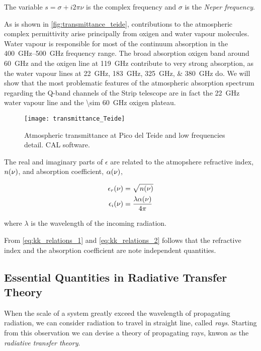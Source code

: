 The variable $s = \sigma + i 2\pi\nu$ is the complex frequency and $\sigma$
is the \emph{Neper frequency}.

As is shown in \autoref{fig:transmittance_teide}, contributions to the
atmospheric complex permittivity arise principally from
oxigen and water vapour molecules. Water vapour is responsible for most of
the continuum absorption in the \SIrange{400}{500}{\giga\hertz} frequency
range. The broad absorption oxigen band around \SI{60}{\giga\hertz} and the
oxigen line at \SI{119}{\giga\hertz} contribute to very strong absorption,
as the water vapour lines at \SIlist{22;183;325;380}{\giga\hertz} do. We will
show that the most problematic features of the atmospheric absorption spectrum
regarding the Q-band channels of the Strip telescope are in fact the
\SI{22}{\giga\hertz} water vapour line and the \SI{\sim 60}{\giga\hertz}
oxigen plateau.

\begin{figure}
        \centering
        \texttt{[image: transmittance\_Teide]}
        \caption{Atmospheric transmittance at Pico del Teide and low
        frequencies detail. CAL software.}
        \label{fig:transmittance_teide}
\end{figure}


The real and imaginary parts of $\epsilon$ are related to the atmopshere
refractive index, $n\qty(\nu)$, and absorption coefficient, $\alpha\qty(\nu)$,

\begin{align}
        \epsilon_r\qty(\nu) & = \sqrt{n\qty(\nu)} \\
        \epsilon_i\qty(\nu) & = \frac{\lambda \alpha\qty(\nu)}{4\pi}
\end{align}

where $\lambda$ is the wavelength of the incoming radiation.

From \autoref{eq:kk_relations_1} and \autoref{eq:kk_relations_2} follows that
the refractive index and the absorption coefficient are note independent
quantities.

\subsection{Essential Quantities in Radiative Transfer Theory}

When the scale of a system greatly exceed the wavelength of propagating
radiation, we can consider radiation to travel in straight line, called
\emph{rays}. Starting from this observation we can devise a theory of
propagating rays, knwon as the \emph{radiative transfer theory}.

